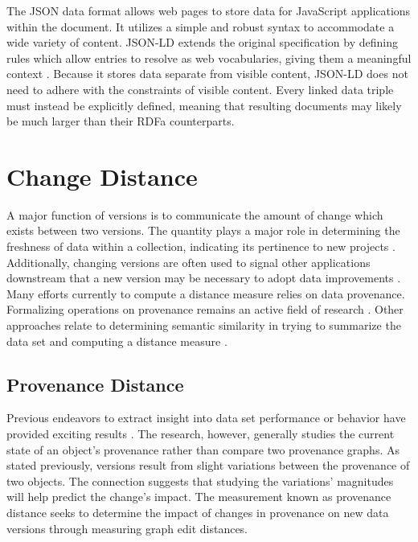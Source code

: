 The JSON data format allows web pages to store data for JavaScript applications within the document.
It utilizes a simple and robust syntax to accommodate a wide variety of content.
JSON-LD extends the original specification by defining rules which allow entries to resolve as web vocabularies, giving them a meaningful context \cite{JSONLD}.
Because it stores data separate from visible content, JSON-LD does not need to adhere with the constraints of visible content.
Every linked data triple must instead be explicitly defined, meaning that resulting documents may likely be much larger than their RDFa counterparts.

\section{Change Distance}

A major function of versions is to communicate the amount of change which exists between two versions.
The quantity plays a major role in determining the freshness of data within a collection, indicating its pertinence to new projects \cite{Bouzeghoub:2004:FAD:1012453.1012464}.
Additionally, changing versions are often used to signal other applications downstream that a new version may be necessary to adopt data improvements \cite{TILMES2011548}.
Many efforts currently to compute a distance measure relies on data provenance.
Formalizing operations on provenance remains an active field of research \cite{Ainy:2015:ASD:2806416.2806429}.
Other approaches relate to determining semantic similarity in trying to summarize the data set and computing a distance measure \cite{Hliaoutakis06informationretrieval}.

\subsection{Provenance Distance}

Previous endeavors to extract insight into data set performance or behavior have provided exciting results \cite{dai2014provenance}.
The research, however, generally studies the current state of an object's provenance rather than compare two provenance graphs.
As stated previously, versions result from slight variations between the provenance of two objects.
The connection suggests that studying the variations' magnitudes will help predict the change's impact.
The measurement known as provenance distance seeks to determine the impact of changes in provenance on new data versions through measuring graph edit distances.

